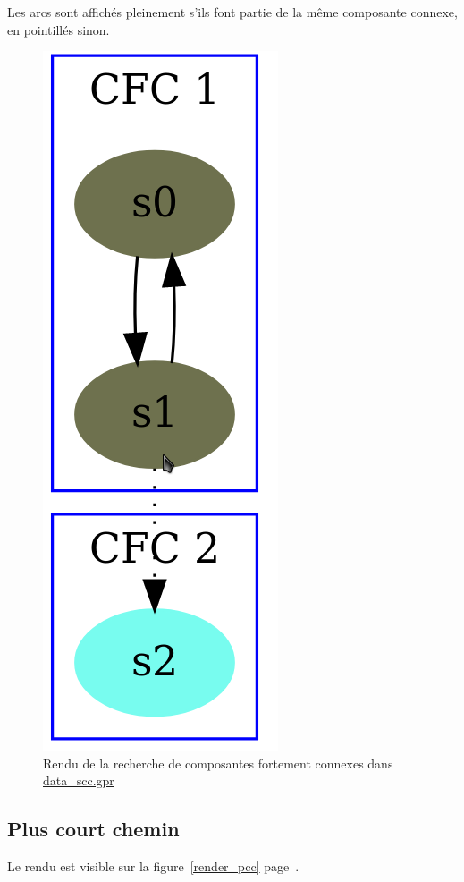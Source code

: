 \documentclass{scrreprt}
\begin{document}
	Les arcs sont affichés pleinement s'ils font partie de la même composante connexe, en pointillés sinon.
	
	\begin{figure}[h]
		\begin{center}
			\includegraphics[scale=0.7]{render_scc}
		\end{center}
		\caption{\label{render_scc} Rendu de la recherche de composantes fortement connexes dans \url{data_scc.gpr}}
	\end{figure}
	\newpage
	
	\subsection{Plus court chemin}
	Le rendu est visible sur la figure~\ref{render_pcc} page~\pageref{render_pcc}.
	
\end{document}
